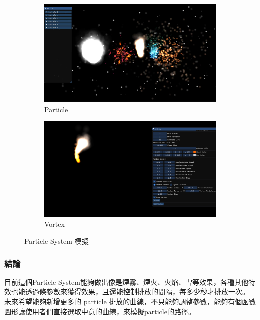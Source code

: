 \begin{figure}[h]
    \begin{subfigure}[b]{0.5\linewidth}
        \includegraphics[width=\linewidth]{./resources/particleSystem/particle.png}
        \caption{Particle}
    \end{subfigure}
    \begin{subfigure}[b]{0.5\linewidth}
        \includegraphics[width=\linewidth]{./resources/particleSystem/vortex.png}
        \caption{Vortex}
    \end{subfigure}
\caption{Particle System 模擬}
\label{fig:simulate}
\end{figure}

\subsubsection{結論}

目前這個Particle System能夠做出像是煙霧、煙火、火焰、雪等效果，各種其他特效也能透過條參數來獲得效果，且還能控制排放的間隔，每多少秒才排放一次。
未來希望能夠新增更多的 particle 排放的曲線，不只能夠調整參數，能夠有個函數圖形讓使用者們直接選取中意的曲線，來模擬particle的路徑。

\newpage

